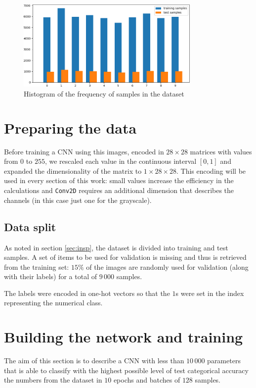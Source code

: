 \documentclass[compsoc]{IEEEtran}
\begin{document}
\begin{figure}[ht!]
\centering                                                                        
\includegraphics[width=3.5in]{hist.png}
\captionsetup{justification=centering}                                                                                         
\caption{Histogram of the frequency of samples in the dataset}
\label{fig:hist}                                                                                                                               
\end{figure}

\section{Preparing the data}
Before training a CNN using this images, encoded in $28\times28$ matrices with values from $0$ to $255$, we rescaled each value in the continuous interval $[0, 1]$ and expanded the dimensionality of the matrix to $1 \times 28 \times 28$. This encoding will be used in every section of this work: small values increase the efficiency in the calculations and \texttt{Conv2D} requires an additional dimension that describes the channels (in this case just one for the grayscale).


\subsection{Data split}
As noted in section \ref{sec:insp}, the dataset is divided into training and test samples. A set of items to be used for validation is missing and thus
is retrieved from the training set: $15\%$ of the images are randomly used for validation (along with their labels) for a total of $9\,000$ samples. \par
The labels were encoded in one-hot vectors so that the $1$s were set in the index representing the numerical class. \par

\section{Building the network and training}
The aim of this section is to describe a CNN with less than $10\,000$ parameters that is able to classify
with the highest possible level of test categorical accuracy the numbers from the dataset in $10$ epochs and batches of $128$ samples. 
\end{document}
